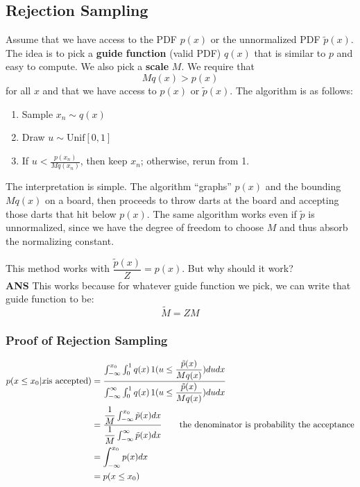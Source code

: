 \documentclass{article}
\begin{document}
\subsection{Rejection Sampling}
Assume that we have access to the PDF $p(x)$ or the unnormalized PDF $\tilde p(x)$. The idea is to pick a \textbf{guide function} (valid PDF) $q(x)$ that is similar to $p$ and easy to compute. We also pick a \textbf{scale} $M$. We require that \[
Mq(x) > p(x)
\]
for all $x$ and that we have access to $p(x)$ or $\widetilde{p}(x)$. The algorithm is as follows:
\begin{enumerate}
\item  Sample $x_n \sim q(x)$
\item  Draw $u \sim \text{Unif}[0,1]$
\item  If $u < \frac{p(x_n)}{Mq(x_n)}$, then keep $x_n$; otherwise, rerun from 1.
\end{enumerate}


The interpretation is simple. The algorithm ``graphs'' $p(x)$ and the bounding $Mq(x)$ on a board, then proceeds to throw darts at the board and accepting those darts that hit below $p(x)$. The same algorithm works even if $\tilde p$ is unnormalized, since we have the degree of freedom to choose $M$ and thus absorb the normalizing constant.

This method works with $\dfrac{\tilde{p}(x)}{Z} = p(x) $. But why should it work?\\
\textbf{ANS} This works because for whatever guide function we pick, we can write that guide function to be: \[
\widetilde{M} = ZM
\]

\subsubsection{Proof of Rejection Sampling}
\begin{align*}
p(x \leq x_0 |x \text{is accepted})
& = \dfrac{ \int_{-\infty}^{x_0} \int_0^1 q(x) \operatorname{1}(u \leq \dfrac{  \tilde{p}(x)  }{  Mq(x)  }) du dx }{ \int_{-\infty}^{\infty} \int_0^1 q(x) \operatorname{1}(u \leq \dfrac{\tilde{p}(x)}{Mq(x)}) du dx  } \\
& = \dfrac{    \dfrac{1}{M} \int_{-\infty}^{x_0} \tilde{p}(x) dx }{   \dfrac{1}{M}  \int_{-\infty}^{\infty}  \tilde{p}(x) dx } \qquad \text{the denominator is probability the acceptance} \\
& = \int_{-\infty}^{x_0} p(x) dx \\
& = p(x \leq x_0)
\end{align*}
\end{document}
